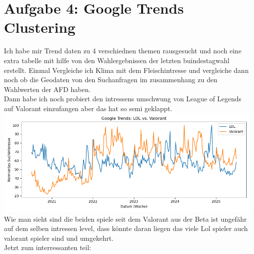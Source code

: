 \documentclass[a4paper,12pt]{scrartcl}
\begin{document}
\section*{Aufgabe 4: Google Trends Clustering}
Ich habe mir Trend daten zu 4 verschiednen themen rausgesucht und noch eine extra tabelle mit hilfe von den Wahlergebnissen der letzten buindestagwahl erstellt. Einmal Vergleiche ich Klima mit dem Fleischintresse und vergleiche dann noch ob die Geodaten von den Suchanfragen im zusammenhang zu den Wahlwerten der AFD haben.\\
Dann habe ich noch probiert den intressens umschwung von League of Legends auf Valorant einzufangen aber das hat so semi geklappt.\\
\includegraphics*[scale=0.6]{ValoLOLTime.png}\\
Wie man sieht sind die beiden spiele seit dem Valorant aus der Beta ist ungefähr auf dem selben intressen level, dass könnte daran liegen das viele Lol spieler auch valorant spieler sind und umgekehrt.\\
Jetzt zum interressanten teil:\\
\end{document}
